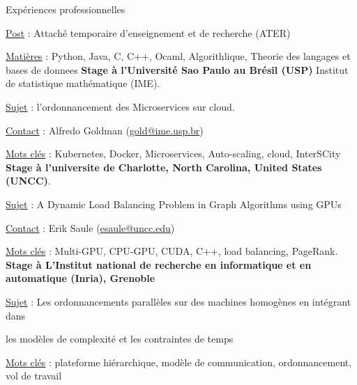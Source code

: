 \begin{rubric}{Expériences professionnelles}
    
    \par \underline{Post} : Attaché temporaire d'enseignement et de recherche (ATER)
    \par \underline{Matières} : Python, Java, C, C++, Ocaml, Algorithlique, Theorie des langages et bases de donnees%
     \textbf{Stage à l'Université Sao Paulo au Brésil (USP)} Institut de statistique mathématique (IME).
     \hfill{} 
    \par \underline{Sujet} : l'ordonnancement des Microservices sur cloud.
    \par \underline{Contact} : Alfredo Goldman (\href{mailto:gold@ime.usp.br}{gold@ime.usp.br})
	\par \underline{Mots clés} : Kubernetes, Docker, Microservices, Auto-scaling, cloud, InterSCity
%
 \textbf{Stage à l’universite de Charlotte, North Carolina, United States (UNCC)}.
     \hfill{} 
	\par \underline{Sujet} : A Dynamic Load Balancing Problem in Graph Algorithms using GPUs
    \par \underline{Contact} : Erik Saule (\href{mailto:esaule@uncc.edu}{esaule@uncc.edu})
	\par \underline{Mots clés} : Multi-GPU, CPU-GPU, CUDA, C++, load balancing, PageRank.
%
%
    \textbf{Stage à L'Institut national de recherche en informatique et en automatique (Inria), Grenoble}
     \hfill{} 
	\par \underline{Sujet} : Les ordonnancements parallèles sur des machines homogènes en intégrant dans
    \par les modèles de complexité et les contraintes de temps
	\par \underline{Mots clés} : plateforme hiérarchique, modèle de communication, ordonnancement, vol de travail

\end{rubric}
